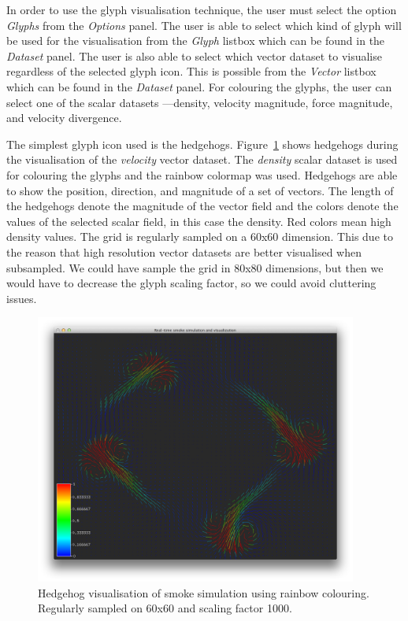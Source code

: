 In order to use the glyph visualisation technique, the user must select the option \emph{Glyphs} from the \emph{Options} panel. The user is able to select which kind of glyph will be used for the visualisation from the \emph{Glyph} listbox which can be found in the \emph{Dataset} panel. The user is also able to select which vector dataset to visualise regardless of the selected glyph icon. This is possible from the \emph{Vector} listbox which can be found in the \emph{Dataset} panel. For colouring the glyphs, the user can select one of the scalar datasets ---density, velocity magnitude, force magnitude, and velocity divergence.

The simplest glyph icon used is the hedgehogs. Figure~\ref{fig:hedgehogs} shows hedgehogs during the visualisation of the \emph{velocity} vector dataset. The \emph{density} scalar dataset is used for colouring the glyphs and the rainbow colormap was used. Hedgehogs are able to show the position, direction, and magnitude of a set of vectors. The length of the hedgehogs denote the magnitude of the vector field and the colors denote the values of the selected scalar field, in this case the density. Red colors mean high density values. The grid is regularly sampled on a 60x60 dimension. This due to the reason that high resolution vector datasets are better visualised when subsampled. We could have sample the grid in 80x80 dimensions, but then we would have to decrease the glyph scaling factor, so we could avoid cluttering issues.

\begin{figure}[htbp]
\begin{center}
 \includegraphics[height=3.5in]{figures/glyph/hedgehogsRainbow.png}
\caption{Hedgehog visualisation of smoke simulation using rainbow colouring. Regularly sampled on 60x60 and scaling factor 1000.}
\label{fig:hedgehogs}
\end{center}
\end{figure}

